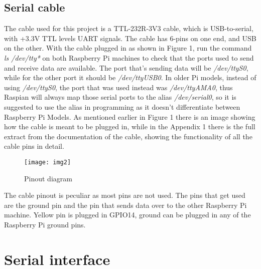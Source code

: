\documentclass[a4paper,11pt]{scrartcl}
\begin{document}
\subsection{Serial cable}
The cable used for this project is a TTL-232R-3V3 cable, which is USB-to-serial, with +3.3V TTL levels UART signals. The cable has 6-pins on one end, and USB on the other.
With the cable plugged in as shown in Figure 1, run the command \textit{ls /dev/tty*} on both Raspberry Pi machines to check that the ports used to send and receive data are available. The port that's sending data will be \textit{/dev/ttyS0}, while for the other port it should be \textit{/dev/ttyUSB0}. In older Pi models, instead of using \textit{/dev/ttyS0}, the port that was used instead was \textit{/dev/ttyAMA0}, thus Raspian will always map those serial ports to the alias \textit{/dev/serial0}, so it is suggested to use the alias in programming as it doesn't differentiate between Raspberry Pi Models. As mentioned earlier in Figure 1 there is an image showing how the cable is meant to be plugged in, while in the Appendix 1 there is the full extract from the documentation of the cable, showing the functionality of all the cable pins in detail.

\begin{figure}[h!]
    \centering 
    \texttt{[image: img2]}
    \caption{Pinout diagram}
    \label{fig:figure1}
\end{figure}

The cable pinout is peculiar as most pins are not used. The pins that get used are the ground pin and the pin that sends data over to the other Raspberry Pi machine. Yellow pin is plugged in GPIO14, ground can be plugged in any of the Raspberry Pi ground pins.

\section{Serial interface}
\end{document}
